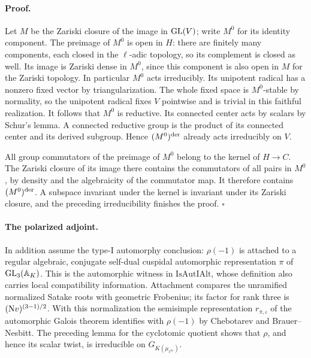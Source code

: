 \paragraph{Proof.}
Let \(M\) be the Zariski closure of the image in \({\rm GL}(V)\);
write \(M^0\) for its identity component. The preimage of \(M^0\)
is open in \(H\): there are finitely many components, each closed
in the \(\ell\)-adic topology, so its complement is closed as well.
Its image is Zariski dense in \(M^0\), since this component is also
open in \(M\) for the Zariski topology. In particular \(M^0\)
acts irreducibly. Its unipotent radical has a nonzero fixed vector
by triangularization. The whole fixed space is \(M^0\)-stable by
normality, so the unipotent radical fixes \(V\) pointwise and is
trivial in this faithful realization. It follows that \(M^0\) is
reductive. Its connected center acts by scalars by Schur's lemma.
A connected reductive group is the product of its connected center
and its derived subgroup. Hence \((M^0)^{\rm der}\) already acts
irreducibly on \(V\).

All group commutators of the preimage of \(M^0\) belong to the
kernel of \(H\to C\). The Zariski closure of its image there
contains the commutators of all pairs in \(M^0\), by density
and the algebraicity of the commutator map. It therefore
contains \((M^0)^{\rm der}\). A subspace invariant under the kernel
is invariant under its Zariski closure, and the preceding
irreducibility finishes the proof. \(\square\)

\paragraph{The polarized adjoint.}
In addition assume the type-I automorphy conclusion: \(\rho(-1)\)
is attached to a regular algebraic, conjugate self-dual cuspidal
automorphic representation \(\pi\) of \({\rm GL}_3(\mathbb A_K)\).
This is the automorphic witness in \(\mathrm{IsAutIAlt}\), whose
definition also carries local compatibility information. Attachment
compares the unramified normalized Satake roots with geometric
Frobenius; its factor for rank three is \(({\rm N}v)^{(3-1)/2}\).
With this normalization the semisimple representation
\(r_{\pi,\iota}\) of the automorphic Galois theorem identifies with
\(\rho(-1)\) by Chebotarev and Brauer--Nesbitt. The preceding lemma
for the cyclotomic quotient shows that \(\rho\), and hence its scalar
twist, is irreducible on \(G_{K(\mu_{\ell^\infty})}\).

